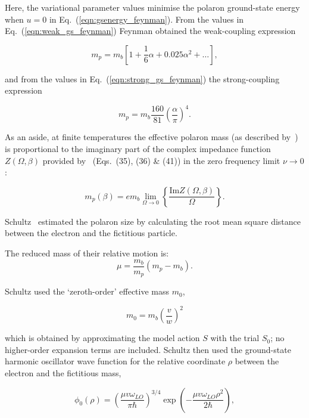 Here, the variational parameter values minimise the polaron ground-state energy when $u = 0$ in Eq.~(\ref{eqn:gsenergy_feynman}). From the values in Eq.~(\ref{eqn:weak_gs_feynman}) Feynman obtained the weak-coupling expression 

\begin{equation}
    \label{eqn:weak_mass_feynman}
    m_p = m_b \left[ 1 + \frac{1}{6} \alpha + 0.025 \alpha^2 + \dots \right] ,
\end{equation}

and from the values in Eq.~(\ref{eqn:strong_gs_feynman}) the strong-coupling expression

\begin{equation}
    \label{eqn:strong_mass_feynman}
    m_p = m_b \frac{160}{81} \left(\frac{\alpha}{\pi}\right)^4.
\end{equation}

As an aside, at finite temperatures the effective polaron mass (as described by~\cite{peeters_theory_1984}) is proportional to the imaginary part of the complex impedance function $Z(\Omega, \beta)$ provided by~\cite{feynman_mobility_1962} (Eqs.~(35), (36) \& (41)) in the zero frequency limit $\nu \to 0$:

\begin{equation}
    m_p(\beta) =  e m_b \lim_{\Omega \to 0} \left\{ \frac{\text{Im} Z(\Omega, \beta)}{\Omega} \right\}.
\end{equation}

Schultz~\cite{schultz_slow_1959} estimated the polaron size by calculating the root mean square distance between the electron and the fictitious particle. 

The reduced mass of their relative motion is:
\begin{equation}
    \label{eqn:red_mass_schultz}
    \mu = \frac{m_b}{m_p} (m_p - m_b).
\end{equation}

Schultz used the `zeroth-order' effective mass $m_0$,

\begin{equation}
     m_0 = m_b \left(\frac{v}{w}\right)^2
\end{equation}

which is obtained by approximating the model action $S$ with the trial $S_0$; no higher-order expansion terms are included. Schultz then used the ground-state harmonic oscillator wave function for the relative coordinate $\rho$ between the electron and the fictitious mass,

\begin{equation}
    \label{eqn:gs_wavefunc_schultz}
    \phi_0(\rho) = \left( \frac{\mu v \omega_{LO}}{\pi\hbar} \right)^{3/4} \exp\left( -\frac{\mu v \omega_{LO} \rho^2}{2\hbar} \right),
\end{equation}

